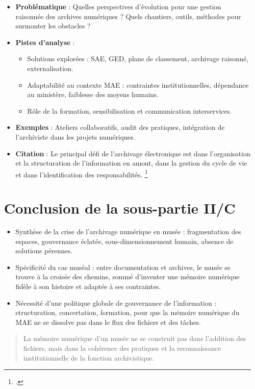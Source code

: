 \begin{itemize}
	\item \textbf{Problématique} : Quelles perspectives d’évolution pour une gestion raisonnée des archives numériques ? Quels chantiers, outils, méthodes pour surmonter les obstacles ?
	\item \textbf{Pistes d’analyse} :
	\begin{itemize}
		\item Solutions explorées : SAE, GED, plans de classement, archivage raisonné, externalisation.
		\item Adaptabilité au contexte MAE : contraintes institutionnelles, dépendance au ministère, faiblesse des moyens humains.
		\item Rôle de la formation, sensibilisation et communication interservices.
	\end{itemize}
	\item \textbf{Exemples} : Ateliers collaboratifs, audit des pratiques, intégration de l’archiviste dans les projets numériques.
	\item \textbf{Citation} : \og Le principal défi de l’archivage électronique est dans l’organisation et la structuration de l’information en amont, dans la gestion du cycle de vie et dans l’identification des responsabilités. \fg \footcite{ministeredelacultureArchivesElectroniquesDans2020}
\end{itemize}

\section{Conclusion de la sous-partie II/C}

\begin{itemize}
	\item Synthèse de la crise de l’archivage numérique en musée : fragmentation des espaces, gouvernance éclatée, sous-dimensionnement humain, absence de solutions pérennes.
	\item Spécificité du cas muséal : entre documentation et archives, le musée se trouve à la croisée des chemins, sommé d’inventer une mémoire numérique fidèle à son histoire et adaptée à ses contraintes.
	\item Nécessité d’une politique globale de gouvernance de l’information : structuration, concertation, formation, pour que la mémoire numérique du MAE ne se dissolve pas dans le flux des fichiers et des tâches.
\end{itemize}

\begin{quote}
	\og La mémoire numérique d’un musée ne se construit pas dans l’addition des fichiers, mais dans la cohérence des pratiques et la reconnaissance institutionnelle de la fonction archivistique. \fg
\end{quote}

